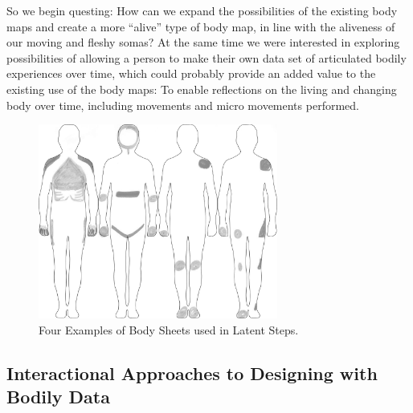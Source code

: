 So we begin questing: How can we expand the possibilities of the existing body maps and create a more ``alive'' type of body map, in line with the aliveness of our moving and fleshy somas? At the same time we were interested in exploring possibilities of allowing a person to make their own data set of articulated bodily experiences over time, which could probably provide an added value to the existing use of the body maps: To enable reflections on the living and changing body over time, including movements and micro movements performed.


\begin{figure}[ht]
    \centering
    \includegraphics[width=0.70\textwidth]{Chapters/Figures/modi_dis/drawing_samples2.png}
    \caption{Four Examples of Body Sheets used in Latent Steps.}
    \label{fig:draw_samples}
\end{figure}

\subsection*{Interactional Approaches to Designing with Bodily Data}


